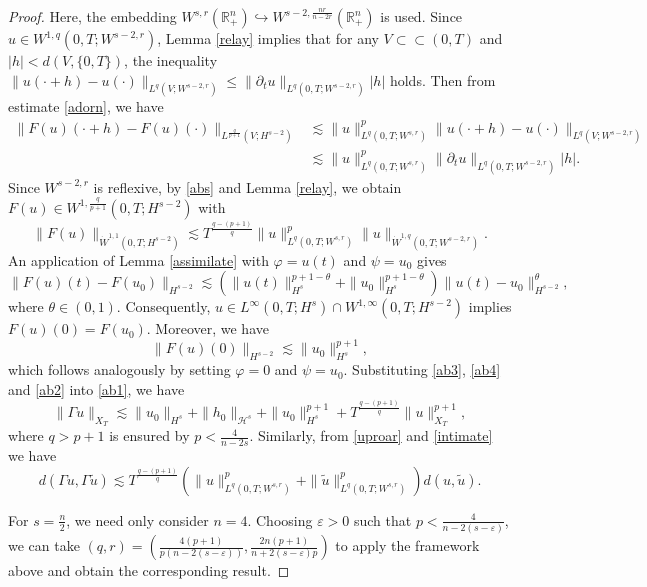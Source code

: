 \documentclass[preprint,compress,12pt]{elsarticle}
\numberwithin{equation}{section}
\begin{document}
\begin{proof}
	Here, the embedding $W^{s,r}(\mathbb{R}_{+}^{n})\hookrightarrow W^{s-2,\frac{nr}{n-2r}}(\mathbb{R}_{+}^{n})$ is used. Since $u\in W^{1,q}(0,T;W^{s-2,r})$, Lemma \ref{relay} implies that for any $V\subset\subset (0,T)$ and $|h|<d(V,\{0,T\})$, the inequality  $\|u(\cdot+h)-u(\cdot)\|_{L^{q}(V;W^{s-2,r})}\leq\|\partial_{t}u\|_{L^{q}(0,T;W^{s-2,r})}|h|$ holds. Then from estimate \eqref{adorn}, we have
	\begin{equation}\label{abs}
		\begin{aligned}
			\|F(u)(\cdot+h)-F(u)(\cdot)\|_{L^{\frac{q}{p+1}}(V;H^{s-2})}&\lesssim \|u\|_{L^{q}(0,T;W^{s,r})}^{p} \|u(\cdot+h)-u(\cdot)\|_{L^{q}(V;W^{s-2,r})}\\&\lesssim\|u\|_{L^{q}(0,T;W^{s,r})}^{p}\|\partial_{t}u\|_{L^{q}(0,T;W^{s-2,r})}|h|.
		\end{aligned}
	\end{equation}
	Since $W^{s-2,r}$ is reflexive, by \eqref{abs} and Lemma \ref{relay}, we obtain $F(u)\in W^{1,\frac{q}{p+1}}(0,T;H^{s-2})$ with
	\begin{equation}\label{ab4}
		\|F(u)\|_{\dot{W}^{1,1}(0,T;H^{s-2})}\lesssim T^{\frac{q-(p+1)}{q}} \|u\|_{L^{q}(0,T;W^{s,r})}^{p} \|u\|_{\dot{W}^{1,q}(0,T;W^{s-2,r})}.
	\end{equation}
	An application of Lemma \ref{assimilate} with $\varphi = u(t)$ and $\psi = u_0$ gives
	\begin{equation*}
		\|F(u)(t)-F(u_{0})\|_{H^{s-2}}\lesssim \left(\|u(t)\|_{H^{s}}^{p+1-\theta}+\|u_{0}\|_{H^{s}}^{p+1-\theta}\right) \|u(t)-u_{0}\|_{H^{s-2}}^{\theta},
	\end{equation*}
	where $\theta \in (0,1)$. Consequently, $u\in L^{\infty}(0,T;H^{s})\cap W^{1,\infty}(0,T;H^{s-2})$ implies $F(u)(0)=F(u_{0})$. Moreover, we have
	\begin{equation}\label{ab2}
		\|F(u)(0)\|_{H^{s-2}}\lesssim \|u_{0}\|_{H^{s}}^{p+1},
	\end{equation}
	which follows analogously by setting $\varphi = 0$ and $\psi=u_{0}$. Substituting \eqref{ab3}, \eqref{ab4} and \eqref{ab2} into \eqref{ab1}, we have
	\begin{equation}
		\|\Gamma u\|_{X_{T}}\lesssim \|u_{0}\|_{H^{s}}+\|h_{0}\|_{\mathcal{H}^{s}}+\|u_{0}\|_{H^{s}}^{p+1}+T^{\frac{q-(p+1)}{q}}\|u\|_{X_{T}}^{p+1},
	\end{equation}
	where $q > p+1$ is ensured by $p < \frac{4}{n-2s}$.	Similarly, from \eqref{uproar} and \eqref{intimate} we have
	\begin{equation}\label{afhh}
		d\left(\Gamma u,\Gamma \tilde{u}\right)\lesssim T^{\frac{q-(p+1)}{q}} \left(\|u\|_{L^{q}(0,T;W^{s,r})}^{p}+\|\tilde{u}\|_{L^{q}(0,T;W^{s,r})}^{p}\right) d(u,\tilde{u}).
	\end{equation}	
	
	For $s=\frac{n}{2}$, we need only consider $n=4$. Choosing $\varepsilon>0$ such that $p<\frac{4}{n-2(s-\varepsilon)}$, we can take $(q, r)=\left(\frac{4(p+1)}{p(n-2(s-\varepsilon))},\frac{2n(p+1)}{n+2(s-\varepsilon)p}\right)$ to apply the framework above and obtain the corresponding result.
\end{proof}
\end{document}
